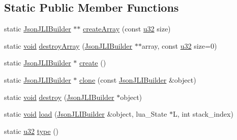 \subsection*{Static Public Member Functions}
\begin{DoxyCompactItemize}
\item 
static \mbox{\hyperlink{classnjli_1_1_json_j_l_i_builder}{Json\+J\+L\+I\+Builder}} $\ast$$\ast$ \mbox{\hyperlink{classnjli_1_1_json_j_l_i_builder_acbd403462d6aef60de6c89832b5690be}{create\+Array}} (const \mbox{\hyperlink{_util_8h_a10e94b422ef0c20dcdec20d31a1f5049}{u32}} size)
\item 
static \mbox{\hyperlink{_thread_8h_af1e856da2e658414cb2456cb6f7ebc66}{void}} \mbox{\hyperlink{classnjli_1_1_json_j_l_i_builder_a776c04d38a57941bc0f314e7f417b2a1}{destroy\+Array}} (\mbox{\hyperlink{classnjli_1_1_json_j_l_i_builder}{Json\+J\+L\+I\+Builder}} $\ast$$\ast$array, const \mbox{\hyperlink{_util_8h_a10e94b422ef0c20dcdec20d31a1f5049}{u32}} size=0)
\item 
static \mbox{\hyperlink{classnjli_1_1_json_j_l_i_builder}{Json\+J\+L\+I\+Builder}} $\ast$ \mbox{\hyperlink{classnjli_1_1_json_j_l_i_builder_ab956ca1d3541404bac077d196774b404}{create}} ()
\item 
static \mbox{\hyperlink{classnjli_1_1_json_j_l_i_builder}{Json\+J\+L\+I\+Builder}} $\ast$ \mbox{\hyperlink{classnjli_1_1_json_j_l_i_builder_ae11c119b938d58a4818b33dcd2bd58aa}{clone}} (const \mbox{\hyperlink{classnjli_1_1_json_j_l_i_builder}{Json\+J\+L\+I\+Builder}} \&object)
\item 
static \mbox{\hyperlink{_thread_8h_af1e856da2e658414cb2456cb6f7ebc66}{void}} \mbox{\hyperlink{classnjli_1_1_json_j_l_i_builder_a825fd69ba4e09e5055153ed490966f43}{destroy}} (\mbox{\hyperlink{classnjli_1_1_json_j_l_i_builder}{Json\+J\+L\+I\+Builder}} $\ast$object)
\item 
static \mbox{\hyperlink{_thread_8h_af1e856da2e658414cb2456cb6f7ebc66}{void}} \mbox{\hyperlink{classnjli_1_1_json_j_l_i_builder_a97d3565ceee960ede9de69bd09f70cad}{load}} (\mbox{\hyperlink{classnjli_1_1_json_j_l_i_builder}{Json\+J\+L\+I\+Builder}} \&object, lua\+\_\+\+State $\ast$L, int stack\+\_\+index)
\item 
static \mbox{\hyperlink{_util_8h_a10e94b422ef0c20dcdec20d31a1f5049}{u32}} \mbox{\hyperlink{classnjli_1_1_json_j_l_i_builder_a78783614cf7ec5dd168d584fa6c4462c}{type}} ()
\end{DoxyCompactItemize}
